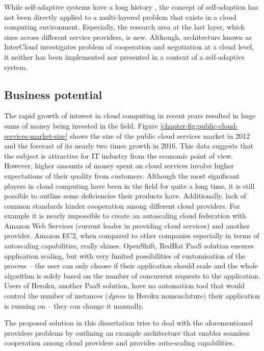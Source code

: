 While self-adaptive systems have a long history \cite{Mu04}, the concept of self-adaption has not been directly applied to a multi-layered problem that exists in a cloud computing environment. Especially, the research area at the last layer, which sizes across different service providers, is new. Although, architecture known as InterCloud \cite{BuRaCa10} investigates problem of cooperation and negotiation at a cloud level, it neither has been implemented nor presented in a context of a self-adaptive system.

\subsection*{Business potential}
The rapid growth of interest in cloud computing in recent years resulted in huge sums of money being invested in the field. Figure \ref{chapter-fig:public-cloud-services-market-size} shows the size of the public cloud services market in 2012 and the forecast of its nearly two times growth in 2016. This data suggests that the subject is attractive for IT industry from the economic point of view. However, higher amounts of money spent on cloud services involve higher expectations of their quality from customers. Although the most significant players in cloud computing have been in the field for quite a long time, it is still possible to outline some deficiencies their products have. Additionally, lack of common standards hinder cooperation among different cloud providers. For example it is nearly impossible to create an autoscaling cloud federation with Amazon Web Services (current leader in providing cloud services\cite{GartnerMagicQuadrantSep2013}) and another provider. Amazon EC2, when compared to other companies especially in terms of autoscaling capabilities, really shines. OpenShift, RedHat PaaS solution ensures application scaling, but with very limited possibilities of customisation of the process -- the user can only choose if their application should scale and the whole algorithm is solely based on the number of concurrent requests to the application. Users of Heroku, another PaaS solution, have no automation tool that would control the number of instances (\emph{dynos} in Heroku nomenclature) their application is running on -- they can change it manually.

The proposed solution in this dissertation tries to deal with the aforementioned providers problems by outlining an example architecture that enables seamless cooperation among cloud providers and provides auto-scaling capabilities.

